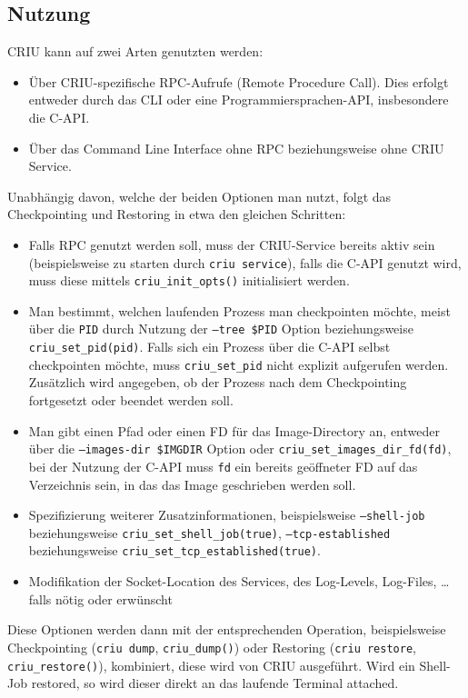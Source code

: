 \documentclass[a4paper]{article}
\begin{document}
\subsection{Nutzung}
CRIU kann auf zwei Arten genutzten werden:
\begin{itemize}
    \item Über CRIU-spezifische RPC-Aufrufe (Remote Procedure Call). Dies erfolgt entweder durch das CLI oder eine Programmiersprachen-API, insbesondere die C-API.
    \item Über das Command Line Interface ohne RPC beziehungsweise ohne CRIU Service.
\end{itemize}
Unabhängig davon, welche der beiden Optionen man nutzt, folgt das Checkpointing und Restoring in etwa den gleichen Schritten:
\begin{itemize}
    \item Falls RPC genutzt werden soll, muss der CRIU-Service bereits aktiv sein (beispielsweise zu starten durch \texttt{criu service}), falls die C-API genutzt wird, muss diese mittels \texttt{criu\_init\_opts()} initialisiert werden.
    \item Man bestimmt, welchen laufenden Prozess man checkpointen möchte, meist über die \texttt{PID} durch Nutzung der \texttt{--tree \$PID} Option beziehungsweise \texttt{criu\_set\_pid(pid)}. Falls sich ein Prozess über die C-API selbst checkpointen möchte, muss \texttt{criu\_set\_pid} nicht explizit aufgerufen werden. Zu\-sätzlich wird angegeben, ob der Prozess nach dem Checkpointing fortgesetzt oder beendet werden soll.
    \item Man gibt einen Pfad oder einen FD für das Image-Directory an, entweder über die \texttt{--images-dir \$IMGDIR} Option oder \texttt{criu\_set\_images\_dir\_fd(fd)}, bei der Nutzung der C-API muss \texttt{fd} ein bereits geöffneter FD auf das Verzeichnis sein, in das das Image geschrieben werden soll.
    \item Spezifizierung weiterer Zusatzinformationen, beispielsweise \texttt{--shell-job} beziehungsweise \texttt{criu\_set\_shell\_job(true)}, \texttt{--tcp-established} beziehungsweise \texttt{criu\_set\_tcp\_established(true)}.
    \item Modifikation der Socket-Location des Services, des Log-Levels, Log-Files, \dots falls nötig oder erwünscht
\end{itemize}
Diese Optionen werden dann mit der entsprechenden Operation, beispielsweise Checkpointing (\texttt{criu dump}, \texttt{criu\_dump()}) oder Restoring (\texttt{criu restore}, \texttt{criu\_restore()}), kombiniert, diese wird von CRIU ausgeführt. Wird ein Shell-Job restored, so wird dieser direkt an das laufende Terminal attached.
\end{document}
